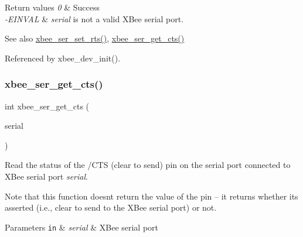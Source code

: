 \begin{DoxyRetVals}{Return values}
{\em 0} & Success \\
\hline
{\em -\/\+E\+I\+N\+V\+AL} & {\itshape serial} is not a valid X\+Bee serial port.\\
\hline
\end{DoxyRetVals}
\begin{DoxySeeAlso}{See also}
\hyperlink{group__xbee__serial_gad1b1f9f42e58d8299ddcca1c9cb3c5e8}{xbee\+\_\+ser\+\_\+set\+\_\+rts()}, \hyperlink{group__xbee__serial_ga894f6fadc890b5ba5ce32338f0acd217}{xbee\+\_\+ser\+\_\+get\+\_\+cts()} 
\end{DoxySeeAlso}


Referenced by xbee\+\_\+dev\+\_\+init().

\mbox{\label{group__hal__dos_ga894f6fadc890b5ba5ce32338f0acd217}} 
\subsubsection{\texorpdfstring{xbee\+\_\+ser\+\_\+get\+\_\+cts()}{xbee\_ser\_get\_cts()}}
{\footnotesize\ttfamily int xbee\+\_\+ser\+\_\+get\+\_\+cts (\begin{DoxyParamCaption}\item[{\hyperlink{structxbee__serial__t}{xbee\+\_\+serial\+\_\+t} $\ast$}]{serial }\end{DoxyParamCaption})}



Read the status of the /\+C\+TS (clear to send) pin on the serial port connected to X\+Bee serial port {\itshape serial}. 

Note that this function doesn\textquotesingle{}t return the value of the pin -- it returns whether it\textquotesingle{}s asserted (i.\+e., clear to send to the X\+Bee serial port) or not.


\begin{DoxyParams}[1]{Parameters}
\mbox{\tt in}  & {\em serial} & X\+Bee serial port\\
\hline
\end{DoxyParams}

